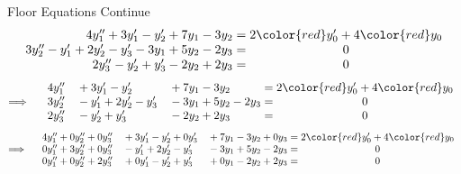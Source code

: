 \begin{frame}{Floor Equations Continue}
\vfill
  \[
    \begin{array}{r@{\;}c@{\;}c}
      4y_1''+3y_1'-y_2'+7y_1-3y_2&=&2{\color{red}y_0'}+4{\color{red}y_0}\\
      3y_2''-y_1'+2y_2'-y_3'-3y_1+5y_2-2y_3&=&0\\
      2y_3''-y_2'+y_3'-2y_2+2y_3&=&0
    \end{array}
  \]
\vfill
  \[
  \Longrightarrow\quad\begin{array}{l@{\quad}l@{\quad}l@{\;}c@{\;}c}
    4y_1'' & {}+3y_1'-y_2' & {}+7y_1-3y_2 &=& 2{\color{red}y_0'}+4{\color{red}y_0}\\
    3y_2'' & {}-y_1'+2y_2'-y_3' & {}-3y_1+5y_2-2y_3 &=& 0\\
    2y_3'' & {}-y_2'+y_3' & {}-2y_2+2y_3 &=& 0
  \end{array}
  \]
\vfill
  \[
  \Longrightarrow\quad\begin{array}{l@{\quad}l@{\quad}l@{\;}c@{\;}c}
    4y_1''+0y_2''+0y_3'' & {}+3y_1'-y_2'+0y_3' & {}+7y_1-3y_2+0y_3 &=& 2{\color{red}y_0'}+4{\color{red}y_0}\\
    0y_1''+3y_2''+0y_3'' & {}-y_1'+2y_2'-y_3' & {}-3y_1+5y_2-2y_3 &=& 0\\
    0y_1''+0y_2''+2y_3'' & {}+0y_1'-y_2'+y_3' & {}+0y_1-2y_2+2y_3 &=& 0
  \end{array}
  \]
\vfill
\end{frame}


